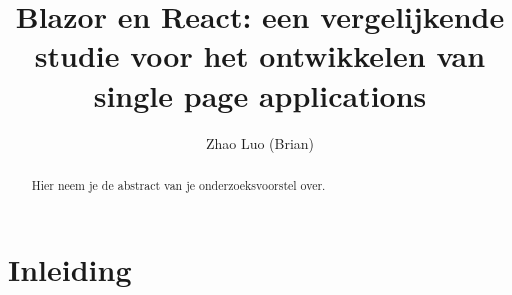 \documentclass{hogent-article}
\title{Blazor en React: een vergelijkende studie voor het ontwikkelen van single page applications}
\author{Zhao Luo (Brian)}
\begin{document}
\begin{abstract}
  Hier neem je de abstract van je onderzoeksvoorstel over.
\end{abstract}

\tableofcontents

\bigskip





\section{Inleiding}%
\label{sec:inleiding}

\end{document}
